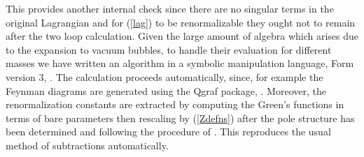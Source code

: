 \documentclass[a4paper,11pt]{article}
\begin{document}
This provides another internal check since there are no singular terms in the
original Lagrangian and for (\ref{lag}) to be renormalizable they ought not to
remain after the two loop calculation. Given the large amount of algebra which
arises due to the expansion to vacuum bubbles, to handle their evaluation for 
different masses we have written an algorithm in a symbolic manipulation 
language, {\sc Form} version $3$, \cite{23}. The calculation proceeds 
automatically, since, for example the Feynman diagrams are generated using the 
{\sc Qgraf} package, \cite{24}. Moreover, the renormalization constants are 
extracted by computing the Green's functions in terms of bare parameters then 
rescaling by (\ref{Zdefns}) after the pole structure has been determined and 
following the procedure of \cite{25}. This reproduces the usual method of 
subtractions automatically. 
\end{document}
